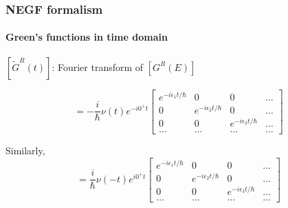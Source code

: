 \documentclass{beamer}
\begin{document}
{

    \begin{frame}
        
        \frametitle{NEGF formalism}
        \framesubtitle{Green's functions in time domain}
        \scriptsize

\vspace{12pt}

$[\tilde{G}^{R}(t)]$: Fourier transform of $[G^{R}(E)]$

\begin{equation*}
    [\tilde{G}^{R}(t)] = -\frac{i}{\hbar}\nu(t)e^{-i0^{+}t}
    \begin{bmatrix}
        e^{-i\epsilon_{1}t/\hbar} & 0 & 0 & \ldots \\
        0 & e^{-i\epsilon_{2}t/\hbar} & 0 & \ldots \\
        0 & 0 & e^{-i\epsilon_{3}t/\hbar} & \ldots \\
        \ldots & \ldots & \ldots & \ldots 
    \end{bmatrix}
\end{equation*}

Similarly, 
\begin{equation*}
    [\tilde{G}^{A}(t)] = \frac{i}{\hbar}\nu(-t)e^{i0^{+}t}
    \begin{bmatrix}
        e^{-i\epsilon_{1}t/\hbar} & 0 & 0 & \ldots \\
        0 & e^{-i\epsilon_{2}t/\hbar} & 0 & \ldots \\
        0 & 0 & e^{-i\epsilon_{3}t/\hbar} & \ldots \\
        \ldots & \ldots & \ldots & \ldots 
    \end{bmatrix}
\end{equation*}

    \end{frame}
}
\end{document}
